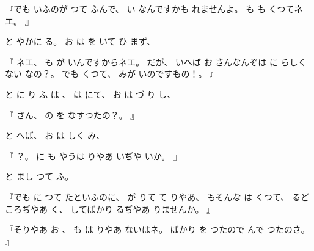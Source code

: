 『でも
いふのが
つて
ふんで、
%
い
なんですかも
れませんよ。
%
も
も
くつてネエ。
』

と
やかに
る。
%
お
は
を
いて
ひ
まず、

『
ネエ、
%
も
が
いんですからネエ。
%
だが、
%
いへば
お
さんなんぞは
に
らしくない
なの？。
%
でも
くつて、
%
みが
いのですもの！。
』

と
に
り
ふ
は
、
%
は
にて、
%
お
は
づ
り
し、

『
さん、
%
の
を
なすつたの？。
』

と
へば、
%
お
は
しく
み、

『
？。
%
に
も
やうは
りやあ
いぢや
いか。
』

と
まし
つて
ふ。

『でも
に
つて
たといふのに、
%
が
りて
て
りやあ、
%
もそんな
は
くつて、
%
るどころぢやあ
く、
%
してばかり
るぢやあ
りませんか。
』

『そりやあ
お
、
%
も
は
りやあ
ないはネ。
%
ばかり
を
つたので
んで
つたのさ。
』

